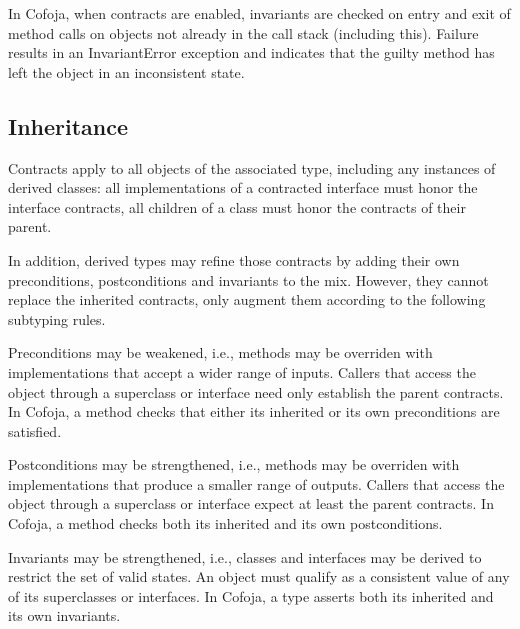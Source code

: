 \documentclass{article}
\begin{document}
In Cofoja, when contracts are enabled, invariants are checked on entry and exit of method calls on objects not already in the call stack (including this). Failure results in an InvariantError exception and indicates that the guilty method has left the object in an inconsistent state.

\subsection{Inheritance}

Contracts apply to all objects of the associated type, including any instances of derived classes: all implementations of a contracted interface must honor the interface contracts, all children of a class must honor the contracts of their parent.

In addition, derived types may refine those contracts by adding their own preconditions, postconditions and invariants to the mix. However, they cannot replace the inherited contracts, only augment them according to the following subtyping rules.

Preconditions may be weakened, i.e., methods may be overriden with implementations that accept a wider range of inputs. Callers that access the object through a superclass or interface need only establish the parent contracts. In Cofoja, a method checks that either its inherited or its own preconditions are satisfied.

Postconditions may be strengthened, i.e., methods may be overriden with implementations that produce a smaller range of outputs. Callers that access the object through a superclass or interface expect at least the parent contracts. In Cofoja, a method checks both its inherited and its own postconditions.

Invariants may be strengthened, i.e., classes and interfaces may be derived to restrict the set of valid states. An object must qualify as a consistent value of any of its superclasses or interfaces. In Cofoja, a type asserts both its inherited and its own invariants.
\end{document}
